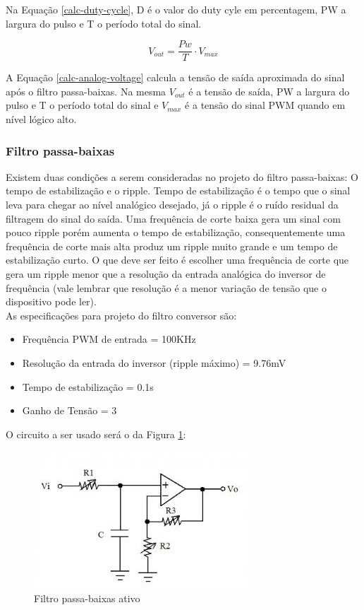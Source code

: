 Na Equação \ref{calc-duty-cycle}, D é o valor do duty cyle em percentagem, PW a largura do pulso e T o período total do sinal.

\begin{equation}\label{calc-analog-voltage}
    V_{out}=\frac{ Pw }{ T } \cdot V_{max}
\end{equation}

A Equação \ref{calc-analog-voltage} calcula a tensão de saída aproximada do sinal após o filtro passa-baixas. Na mesma $V_{out}$ é a tensão de saída, PW a largura do pulso e T o período total do sinal e $V_{max}$ é a tensão do sinal PWM quando em nível lógico alto.

\subsubsection*{Filtro passa-baixas}

Existem duas condições a serem consideradas no projeto do filtro passa-baixas: O tempo de estabilização e o ripple. Tempo de estabilização é o tempo que o sinal leva para chegar ao nível analógico desejado, já o ripple é o ruído residual da filtragem do sinal do saída. Uma frequência de corte baixa gera um sinal com pouco ripple porém aumenta o tempo de estabilização, consequentemente uma frequência de corte mais alta produz um ripple muito grande e um tempo de estabilização curto. O que deve ser feito é escolher uma frequência de corte que gera um ripple menor que a resolução da entrada analógica do inversor de frequência (vale lembrar que resolução é a menor variação de tensão que o dispositivo pode ler). \\

As especificações para projeto do filtro conversor são:

\begin{itemize}
    \item Frequência PWM de entrada = 100KHz
    \item Resolução da entrada do inversor (ripple máximo) = 9.76mV
    \item Tempo de estabilização = 0.1s
    \item Ganho de Tensão = 3
\end{itemize}

O circuito a ser usado será o da Figura \ref{active-lpf}:

\begin{figure}[htbp]
    \centering
    \includegraphics[scale=0.3]{figuras/lpf.jpg}
    \caption{Filtro passa-baixas ativo}
    \label{active-lpf}
\end{figure}

